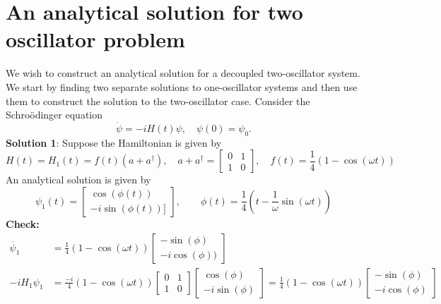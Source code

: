 \documentclass[11pt]{article}
\begin{document}



\section{An analytical solution for two oscillator problem}
We wish to construct an analytical solution for a decoupled two-oscillator system.  We start by finding two separate solutions to one-oscillator systems and then use them to construct the solution to the two-oscillator case.  Consider the Schro\"odinger equation
\begin{equation}\label{eq_schrodinger}
\dot{\psi} = -i H(t) \psi,\quad \psi(0) = \psi_0.
\end{equation}
\textbf{Solution 1}: Suppose the Hamiltonian is given by
\begin{equation}
    H(t)=H_1(t) = f(t)(a+a^\dag), \quad a+a^\dag =
    \begin{bmatrix}
        0 & 1\\
        1 & 0
    \end{bmatrix}, \quad f(t) = \frac{1}{4}(1-\cos(\omega t))
\end{equation}
An analytical solution is given by
\begin{equation}
    \psi_1(t) = \begin{bmatrix}
                    \cos(\phi(t))\\
                    -i\sin(\phi(t))]
                \end{bmatrix}, \quad \quad \phi(t) = \frac{1}{4}(t-\frac{1}{\omega}\sin(\omega t))
\end{equation}
\textbf{Check:}
\begin{align}
    \dot{\psi_1} &= \frac{1}{4}(1-\cos(\omega t)) \begin{bmatrix} -\sin(\phi)\\
                                    -i\cos(\phi)) \end{bmatrix}\\
    -iH_1\psi_1 &= \frac{-i}{4}(1-\cos(\omega t))\begin{bmatrix} 0 & 1\\ 1 & 0 \end{bmatrix}
                                            \begin{bmatrix} \cos(\phi) \\ -i\sin(\phi) \end{bmatrix} =
                                            \frac{1}{4}(1-\cos(\omega t)) \begin{bmatrix} -\sin(\phi)\\
                                            -i\cos(\phi) \end{bmatrix}
\end{align}
\end{document}
